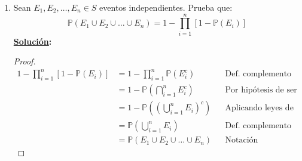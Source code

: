 \documentclass[11pt,letterpaper]{report}
\newcommand{\Pro}{\mathds{P}}
\newcommand{\sol}{\textbf{\underline{Solución}: }} %
\begin{document}
\begin{enumerate}
\begin{itemize}
    \item Sea $\{ E_i \}_{i=0}^\infty \subseteq S$ sucesión de eventos mutuamente excluyentes
    entonces:
    \[
        \Pro(E_j | \cup_{i=1}^{\infty} E_i) = \frac{\Pro(E_j)}
            {\sum_{i=1}^{\infty} \Pro(E_i)}
    \]
    \sol \begin{proof}
        \begin{align*}
            \Pro(E_j | \cup_{i=1}^{\infty} E_i)
                &= \frac{\Pro(E_j \cap (\cup_{i=1}^{\infty} E_i))}{\Pro(\cup_{i=1}^{\infty} E_i)} && \text{Por ($\heartsuit$)}\\
                &= \frac{\Pro(\cup_{i=1}^{\infty} (E_j \cap E_i))}{\Pro(\cup_{i=1}^{\infty} E_i)} && \text{Por distributividad de conjuntos}\\
                &= \frac{\Pro((\cup_{i=1}^{j-1} (E_j \cap E_i)) \cup (E_j \cap E_j) \cup (\cup_{i=j+1}^{\infty} (E_j \cap E_i)))}
                {\Pro(\cup_{i=1}^{\infty} E_i)} && \text{Separando la unión}\\
                &= \frac{\Pro(\emptyset \cup E_j \cup \emptyset)}{\Pro(\cup_{i=1}^{\infty} E_i)} && \text{Por hipótesis}\\
                &= \frac{\Pro(E_j)}{\Pro(\cup_{i=1}^{\infty} E_i)} && \text{Por identidad en conjuntos}\\
                &= \frac{\Pro(E_j)}{\sum_{i=1}^{\infty} \Pro(E_i)} && \text{Por hipótesis}\\
        \end{align*}
    \end{proof}
\end{itemize}

\item Sean $E_1, E_2, \ldots , E_n \in S$ eventos independientes. Prueba que:
\[
    \Pro(E_1 \cup E_2 \cup \ldots \cup E_n) = 1 - \prod_{i=1}^{n} [1 - \Pro(E_i)]
\]
\sol \begin{proof}
    \begin{align*}
        1 - \prod_{i=1}^{n} [1 - \Pro(E_i)]
            &= 1 - \prod_{i=1}^{n} \Pro(E_i^c) && \text{Def. complemento}\\
            &= 1 - \Pro(\bigcap_{i=1}^{n} E_i^c) && \text{Por hipótesis de ser eventos independientes}\\
            &= 1 - \Pro((\bigcup_{i=1}^{n} E_i)^c) && \text{Aplicando leyes de De Morgan}\\
            &= \Pro(\bigcup_{i=1}^{n} E_i) && \text{Def. complemento}\\
            &= \Pro(E_1 \cup E_2 \cup \ldots \cup E_n) && \text{Notación}
    \end{align*}
\end{proof}


\end{enumerate}
\end{document}
